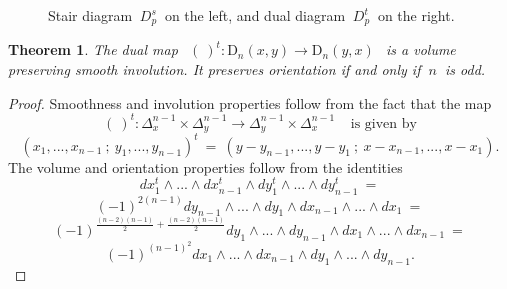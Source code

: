 \documentclass[10pt,leqeq]{article}
\newtheorem{thm}{Theorem}%
\begin{document}
\begin{figure}

  \caption{Stair diagram  $\ D_p^s \ $ on the left, and dual diagram $\ D_p^{t}\ $ on the right.}
  \label{fig:dd}
\end{figure}


\begin{thm}{\em The dual map 
$\ \ (\ )^t:\mathrm{D}_n(x,y) \longrightarrow \mathrm{D}_n(y,x) \ \ $ is a volume preserving smooth involution. It preserves orientation if and only if $\ n \ $ is odd.
}
\end{thm}

\begin{proof} Smoothness and involution properties follow from the fact that
the map $$( \ )^t:\Delta^{n-1}_x \times \Delta^{n-1}_y \longrightarrow \Delta^{n-1}_y \times \Delta^{n-1}_x\ \ \ \ \ \mbox{is given by} $$
$$ (x_1,...,x_{n-1}\ ; \ y_1,...,y_{n-1})^t \ = \ (y-y_{n-1},...,y-y_{1}\ ; \ x-x_{n-1},...,x-x_{1}).$$
The volume and orientation properties follow from the identities
$$dx_1^t\wedge...\wedge dx_{n-1}^t \wedge dy_1^t\wedge...\wedge dy_{n-1}^t \ = $$  
$$(-1)^{2(n-1)}dy_{n-1}\wedge...\wedge dy_{1} \wedge dx_{n-1}\wedge...\wedge dx_{1} \ =$$
$$(-1)^{\frac{(n-2)(n-1)}{2}+\frac{(n-2)(n-1)}{2}}dy_{1}\wedge...\wedge dy_{n-1} \wedge dx_{1}\wedge...\wedge dx_{n-1} \ = $$
$$(-1)^{(n-1)^2}dx_{1}\wedge...\wedge dx_{n-1} \wedge dy_{1}\wedge...\wedge dy_{n-1}.$$
\end{proof}
\end{document}
